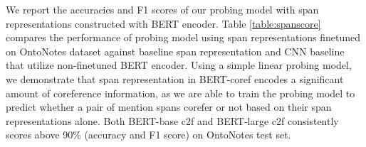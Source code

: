 \documentclass[11pt]{article}
\begin{document}







We report the accuracies and F1 scores of our probing model with span representations constructed with BERT encoder. Table \ref{table:spanscore} compares the performance of probing model using span representations finetuned on OntoNotes dataset against baseline span representation and CNN baseline that utilize non-finetuned BERT encoder. Using a simple linear probing model, we demonstrate that span representation in BERT-coref encodes a significant amount of coreference information, as we are able to train the probing model to predict whether a pair of mention spans corefer or not based on their span representations alone. Both BERT-base c2f and BERT-large c2f consistently scores above 90\% (accuracy and F1 score) on OntoNotes test set. 
\end{document}
